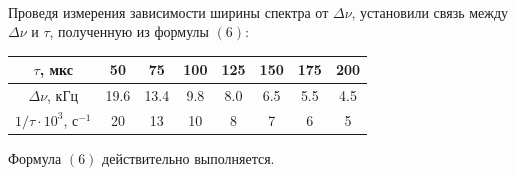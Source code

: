 \begin{figure}[H]
    \centering
    \\
    \end{figure}
\begin{figure}[H]
    \centering
\end{figure}
\n
Проведя измерения зависимости ширины спектра от $\Delta \nu$, установили связь между $\Delta \nu$ и $\tau$, полученную из формулы $(6)$:
\begin{center}
\begin{tabular}{|c|c|c|c|c|c|c|c|}
\hline
$\tau$, мкс & 50 & 75 & 100 & 125 & 150 & 175 & 200 \\ \hline
$\Delta \nu$, кГц & 19.6 & 13.4 & 9.8 & 8.0 & 6.5 & 5.5 & 4.5 \\ \hline
$1/\tau \cdot 10^3$, с$^{-1}$ & 20 & 13 & 10 & 8 & 7 & 6 & 5 \\ \hline
\end{tabular}
\end{center}
\begin{center}
\end{center}
Формула $(6)$ действительно выполняется.

